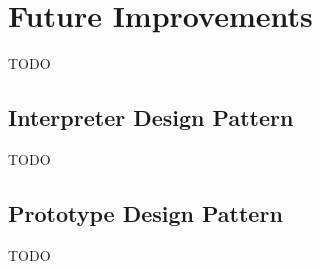\section*{Future Improvements}
TODO

\subsection*{Interpreter Design Pattern}
TODO

\subsection{Prototype Design Pattern}
TODO